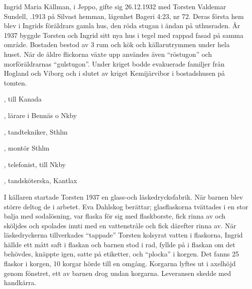 Ingrid Maria Källman,  i Jeppo, gifte sig 26.12.1932 med Torsten Valdemar Sundell, .1913 på Silvast hemman, lägenhet Bageri 4:23, nr 72. Deras första hem blev i Ingrids föräldrars gamla hus, den röda stugan i ändan på uthusraden. År 1937 byggde 	Torsten och Ingrid sitt nya hus i tegel med rappad fasad på samma område. Bostaden bestod av 3 rum och kök och källarutrymmen under hela huset. När de äldre flickorna växte upp användes även ``röstugon'' och morföräldrarnas ``gulstugon''. Under kriget bodde evakuerade 	familjer från Hogland och Viborg och i slutet av kriget Kemijärvibor i 	bostadshusen på tomten.
\begin{jhchildren}
  \item {}, till Kanada
  \item {}, lärare i Bennäs o Nkby
  \item {}, tandtekniker, Sthlm
  \item {}, montör Sthlm
  \item {}, telefonist, till Nkby
  \item {}, tandsköterska, Kantlax
  \item {}
\end{jhchildren}

I källaren startade Torsten 1937 en glass-och läskedrycksfabrik. När barnen blev större deltog de i arbetet. Eva Dahlskog berättar; glasflaskorna tvättades i en stor balja med sodalösning, var flaska för sig med flaskborste, fick rinna av och sköljdes och spolades inuti med en vattenstråle och fick därefter rinna av. När läskedryckerna tillverkades ``tappade'' Torsten kolsyrat vatten i flaskorna, Ingrid hällde ett mått saft i flaskan och barnen stod i rad, fyllde på i flaskan om det behövdes,	knäppte igen, satte på etiketter, och ``plocka'' i korgen. Det fanns 25 flaskor i korgen, 10 korgar hörde till en omgång. Korgarna lyftes ut i axelhöjd genom fönstret, ett av barnen drog undan korgarna. Leveransen 	skedde med handkärra.

